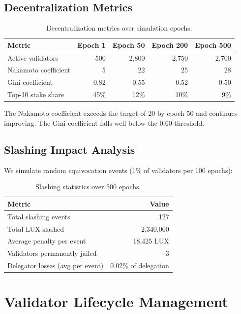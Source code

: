 \documentclass[11pt,a4paper]{article}
\begin{document}
\subsection{Decentralization Metrics}

\begin{table}[H]
\centering
\caption{Decentralization metrics over simulation epochs.}
\label{tab:decentralization}
\begin{tabular}{lrrrr}
\toprule
\textbf{Metric} & \textbf{Epoch 1} & \textbf{Epoch 50} & \textbf{Epoch 200} & \textbf{Epoch 500} \\
\midrule
Active validators & 500 & 2,800 & 2,750 & 2,700 \\
Nakamoto coefficient & 5 & 22 & 25 & 28 \\
Gini coefficient & 0.82 & 0.55 & 0.52 & 0.50 \\
Top-10 stake share & 45\% & 12\% & 10\% & 9\% \\
\bottomrule
\end{tabular}
\end{table}

The Nakamoto coefficient exceeds the target of 20 by epoch 50 and continues improving. The Gini coefficient falls well below the 0.60 threshold.

\subsection{Slashing Impact Analysis}

We simulate random equivocation events (1\% of validators per 100 epochs):

\begin{table}[H]
\centering
\caption{Slashing statistics over 500 epochs.}
\label{tab:slashing_stats}
\begin{tabular}{lr}
\toprule
\textbf{Metric} & \textbf{Value} \\
\midrule
Total slashing events & 127 \\
Total LUX slashed & 2,340,000 \\
Average penalty per event & 18,425 LUX \\
Validators permanently jailed & 3 \\
Delegator losses (avg per event) & 0.02\% of delegation \\
\bottomrule
\end{tabular}
\end{table}

\section{Validator Lifecycle Management}\label{sec:lifecycle}
\end{document}
